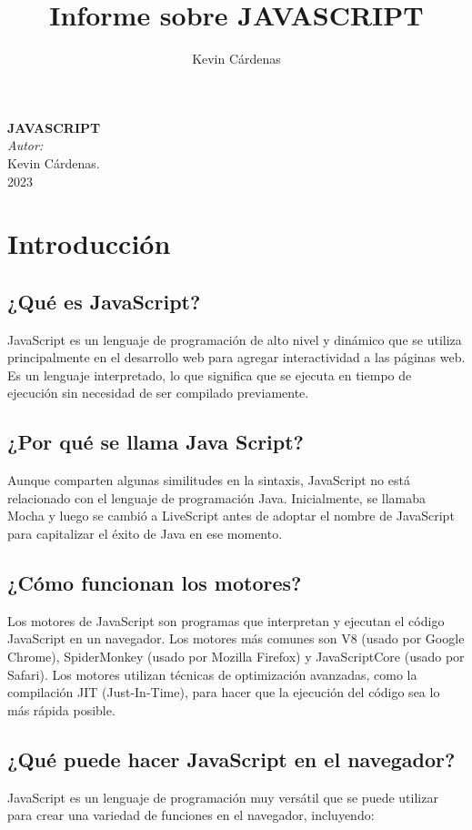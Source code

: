 \documentclass[executivepaper]{article}
\title{Informe sobre JAVASCRIPT}
\author{Kevin Cárdenas}
\begin{document}
\begin{titlepage}
    \begin{center}
        {\Huge \textbf{JAVASCRIPT}}
        \\[18cm]

        \large\emph{Autor:}\\
        Kevin Cárdenas.
        \\[1cm]
        {\large 2023}
    \end{center}
\end{titlepage}

\newpage
\tableofcontents
\newpage

\section{Introducción}

\subsection*{¿Qué es JavaScript?}
JavaScript es un lenguaje de programación de alto nivel y dinámico que se utiliza principalmente en el desarrollo web para agregar interactividad a las páginas web. Es un lenguaje interpretado, lo que significa que se ejecuta en tiempo de ejecución sin necesidad de ser compilado previamente.

\subsection*{¿Por qué se llama Java Script?}
Aunque comparten algunas similitudes en la sintaxis, JavaScript no está relacionado con el lenguaje de programación Java. Inicialmente, se llamaba Mocha y luego se cambió a LiveScript antes de adoptar el nombre de JavaScript para capitalizar el éxito de Java en ese momento.

\subsection*{¿Cómo funcionan los motores?}
Los motores de JavaScript son programas que interpretan y ejecutan el código JavaScript en un navegador. Los motores más comunes son V8 (usado por Google Chrome), SpiderMonkey (usado por Mozilla Firefox) y JavaScriptCore (usado por Safari). Los motores utilizan técnicas de optimización avanzadas, como la compilación JIT (Just-In-Time), para hacer que la ejecución del código sea lo más rápida posible.

\subsection*{¿Qué puede hacer JavaScript en el navegador?}
JavaScript es un lenguaje de programación muy versátil que se puede utilizar para crear una variedad de funciones en el navegador, incluyendo:
\end{document}
